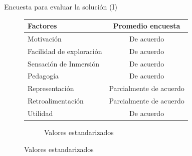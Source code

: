 \begin{frame}{Encuesta para evaluar la solución (I)}

\begin{figure}
    \scriptsize
    \centering
    \begin{subtable}[b]{.5\linewidth}
        \tiny
        \begin{tabular}{lc}
        \toprule
        Factores                 & Promedio encuesta \\
        \midrule
        Motivación               & De acuerdo \\
        Facilidad de exploración & De acuerdo \\
        Sensación de Inmersión   & De acuerdo \\
        Pedagogía                & De acuerdo \\
        Representación           & Parcialmente de acuerdo \\
        Retroalimentación        & Parcialmente de acuerdo \\
        Utilidad                 & De acuerdo \\
        \bottomrule
        \end{tabular}
        \caption{Aceptación por aspecto de la solución}
    \end{subtable}\hfill
    \pause
    \begin{subfigure}[b]{.5\linewidth}
        \tiny
        \caption{Valores estandarizados}
    \end{subfigure}
\end{figure}

\end{frame}
